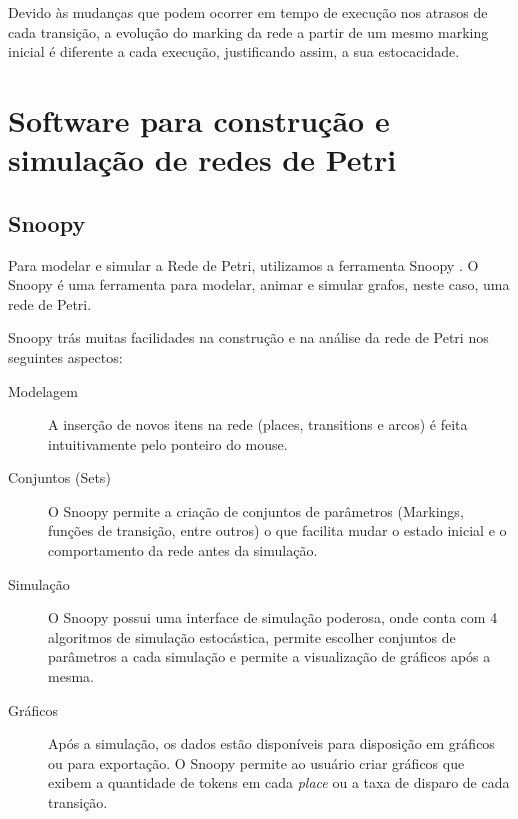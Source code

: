 \documentclass[a4paper,10pt]{article}
\begin{document}
% 		
% 		
		
		Devido às mudanças que podem ocorrer em tempo de execução nos atrasos de cada transição, a evolução do marking da rede 
		a partir de um mesmo marking inicial é diferente a cada execução, justificando assim, a sua estocacidade.
	
    \section{Software para construção e simulação de redes de Petri}
    
		\subsection{Snoopy}
		
		Para modelar e simular a Rede de Petri, utilizamos a ferramenta Snoopy \cite{Heiner2012}. O Snoopy é uma ferramenta 
		para modelar, animar e simular grafos, neste caso, uma rede de Petri.
		
		Snoopy trás muitas facilidades na construção e na análise da rede de Petri nos seguintes aspectos:
		\begin{description}
			\item[Modelagem] A inserção de novos itens na rede (places, transitions e arcos) é feita intuitivamente pelo ponteiro do mouse.
			\item[Conjuntos (Sets)] O Snoopy permite a criação de conjuntos de parâmetros (Markings, funções de transição, entre outros) o que facilita mudar o estado inicial
				e o comportamento da rede antes da simulação.
			\item[Simulação] O Snoopy possui uma interface de simulação poderosa, onde conta com 4 algoritmos de simulação estocástica, permite escolher conjuntos de parâmetros a cada 
				simulação e permite a visualização de gráficos após a mesma.
			\item[Gráficos] Após a simulação, os dados estão disponíveis para disposição em gráficos ou para exportação. O Snoopy permite ao usuário criar gráficos que exibem a quantidade
				de tokens em cada \textit{place} ou a taxa de disparo de cada transição. 
		\end{description}
\end{document}
